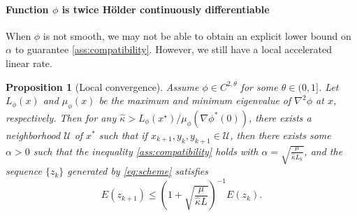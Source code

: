 \documentclass{article}
\theoremstyle{plain}
\newtheorem{proposition}[theorem]{Proposition}
\theoremstyle{definition}
\theoremstyle{remark}
\newtheorem{example}[theorem]{Example}
\begin{document}

\paragraph{Function $\phi$ is twice H\"older continuously differentiable}
When $\phi$ is not smooth, we may not be able to obtain an explicit lower bound on $\alpha$ to guarantee \eqref{ass:compatibility}. However, we still have a local accelerated linear rate.
\begin{proposition}[Local convergence]
    Assume $\phi\in C^{2,\theta}$ for some $\theta\in(0,1]$. Let $L_\phi(x)$ and $\mu_\phi(x)$ be the maximum and minimum eigenvalue of $\nabla^2\phi$ at $x$, respectively. Then for any $\hat{\kappa}>L_{\phi}(x^\star)/\mu_{\phi}(\nabla \phi^*(0
    ))$, there exists a neighborhood $\mathcal{U}$ of $x^*$ such that if $x_{k+1},y_k,y_{k+1}\in \mathcal{U}$, then there exists some $\alpha>0$ such that the inequality \eqref{ass:compatibility} holds with $\alpha=\sqrt{\frac{\mu}{\hat{\kappa} L_k}}$, and the sequence $\{z_k\}$ generated by \eqref{eq:scheme} satisfies
$$
E(z_{k+1}) \leq \left(1 + \sqrt{\frac{\mu}{\hat{\kappa} L}}\right)^{-1} E(z_k).
$$
\end{proposition}
\end{document}
